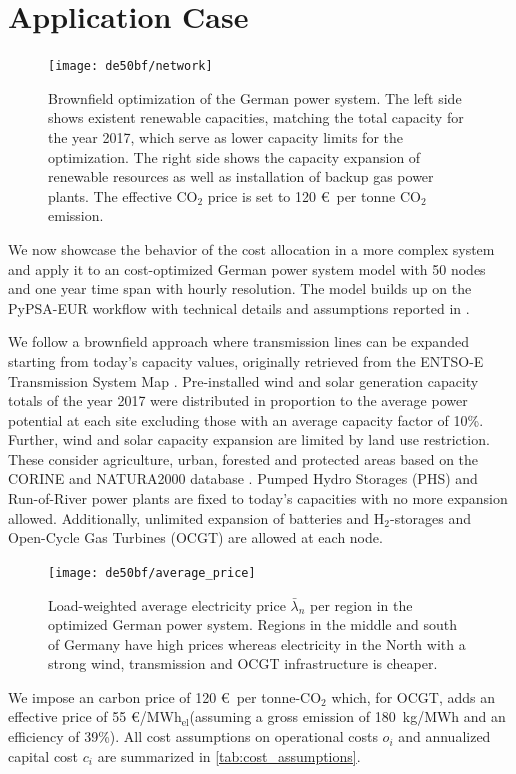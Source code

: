 \documentclass[11pt,twocolumn]{article}
\newcommand{\averagelmp}{\bar{\lambda}_n}
\newcommand{\megawatthour}{MWh$_\text{el}$}
\begin{document}
\section{Application Case}
\label{sec:application_case}
% 
\begin{figure}[t]
    \centering
    \texttt{[image: de50bf/network]}
    \caption{Brownfield optimization of the German power system. The left side shows existent renewable capacities, matching the total capacity for the year 2017, which serve as lower capacity limits for the optimization. The right side shows the capacity expansion of renewable resources as well as installation of backup gas power plants. The effective CO$_2$ price is set to 120 \euro\, per tonne CO$_2$ emission.}
    \label{fig:network}
\end{figure}
% 
We now showcase the behavior of the cost allocation in a more complex system and apply it to an cost-optimized German power system model with 50 nodes and one year time span with hourly resolution. The model builds up on the PyPSA-EUR workflow \cite{horsch_jonas_pypsa-eur_2020} with technical details and assumptions reported in \cite{horsch_pypsa-eur_2018}. 

We follow a brownfield approach where transmission lines can be expanded starting from today's capacity values, originally retrieved from the ENTSO-E Transmission System Map \cite{entso-e_entso-e_nodate}. Pre-installed wind and solar generation capacity totals of the year 2017 were distributed in proportion to the average power potential at each site excluding those with an average capacity factor of 10\%. Further, wind and solar capacity expansion are limited by land use restriction. These consider agriculture, urban, forested and protected areas based on the CORINE and NATURA2000 database \cite{eea_corine_2012,eea_natura_2016}. Pumped Hydro Storages (PHS) and Run-of-River power plants are fixed to today's capacities with no more expansion allowed. Additionally, unlimited expansion of batteries and H$_{2}$-storages and Open-Cycle Gas Turbines (OCGT) are allowed at each node. 
% 
% 
\begin{figure}
    \centering
    \texttt{[image: de50bf/average\_price]}
    \caption{Load-weighted average electricity price $\averagelmp$ per region in the optimized German power system. Regions in the middle and south of Germany have high prices whereas electricity in the North with a strong wind, transmission and OCGT infrastructure is cheaper.}
    \label{fig:average_price}
\end{figure}
We impose an carbon price of 120 \euro\, per tonne-CO$_{2}$ which, for OCGT, adds an effective price of 55 \euro/\megawatthour (assuming a gross emission of 180~kg/MWh and an efficiency of 39\%). All cost assumptions on operational costs $o_i$ and annualized capital cost $c_i$ are summarized in \cref{tab:cost_assumptions}. 
\end{document}
